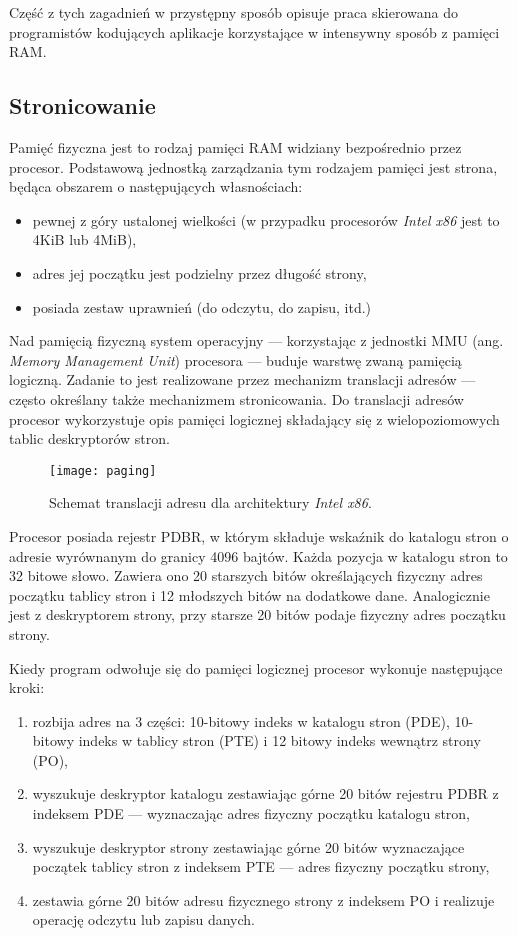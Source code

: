 \documentclass[12pt,a4paper,titlepage,twoside]{mwart}
\begin{document}
Część z tych zagadnień w przystępny sposób opisuje praca \cite{pas02memory}
skierowana do programistów kodujących aplikacje korzystające w intensywny
sposób z pamięci RAM.

\subsection{Stronicowanie}

Pamięć fizyczna jest to rodzaj pamięci RAM widziany bezpośrednio przez
procesor. Podstawową jednostką zarządzania tym rodzajem pamięci jest strona,
będąca obszarem o następujących własnościach:

\begin{itemize}
\item pewnej z góry ustalonej wielkości (w przypadku procesorów \textit{Intel
x86} jest to 4KiB lub 4MiB),
\item adres jej początku jest podzielny przez długość strony,
\item posiada zestaw uprawnień (do odczytu, do zapisu, itd.)
\end{itemize}

Nad pamięcią fizyczną system operacyjny --- korzystając z jednostki MMU (ang.
\textit{Memory Management Unit}) procesora --- buduje warstwę zwaną pamięcią
logiczną. Zadanie to jest realizowane przez mechanizm translacji adresów ---
często określany także mechanizmem stronicowania. Do translacji adresów
procesor wykorzystuje opis pamięci logicznej składający się z wielopoziomowych
tablic deskryptorów stron.

\begin{figure}[ht]
\centering
\texttt{[image: paging]}
\caption{Schemat translacji adresu dla architektury \textit{Intel x86}.}
\end{figure}

Procesor posiada rejestr PDBR, w którym składuje wskaźnik do katalogu stron o
adresie wyrównanym do granicy 4096 bajtów. Każda pozycja w katalogu stron to 32
bitowe słowo. Zawiera ono 20 starszych bitów określających fizyczny adres
początku tablicy stron i 12 młodszych bitów na dodatkowe dane.  Analogicznie
jest z deskryptorem strony, przy starsze 20 bitów podaje fizyczny adres
początku strony.

Kiedy program odwołuje się do pamięci logicznej procesor wykonuje następujące kroki:
\begin{enumerate}
\item rozbija adres na 3 części: 10-bitowy indeks w katalogu stron (PDE), 10-bitowy
indeks w tablicy stron (PTE) i 12 bitowy indeks wewnątrz strony (PO),
\item wyszukuje deskryptor katalogu zestawiając górne 20 bitów rejestru PDBR z
indeksem PDE --- wyznaczając adres fizyczny początku katalogu stron,
\item wyszukuje deskryptor strony zestawiając górne 20 bitów wyznaczające
początek tablicy stron z indeksem PTE --- adres fizyczny początku strony,
\item zestawia górne 20 bitów adresu fizycznego strony z indeksem PO i
realizuje operację odczytu lub zapisu danych.
\end{enumerate}
\end{document}
